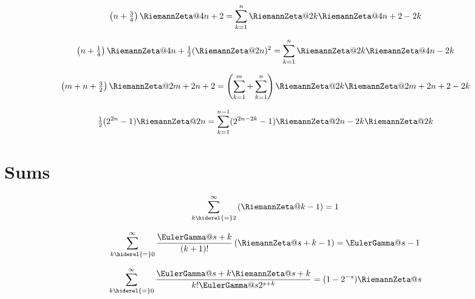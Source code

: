 \documentclass{article}
\begin{document}
\begin{equation}\label{eq:ZE.INA.REC3}%
  \left( n + \tfrac{3}{4} \right) \RiemannZeta@{4n+2}
  = \sum_{k=1}^n \RiemannZeta@{2k} \RiemannZeta@{4n+2-2k}
\end{equation}

\begin{equation}\label{eq:ZE.INA.REC4}%
  {\left( n + \tfrac{1}{4} \right) \RiemannZeta@{4n}
  + \tfrac{1}{2} (\RiemannZeta@{2n})^2
  = \sum_{k=1}^n \RiemannZeta@{2k} \RiemannZeta@{4n-2k}}
\end{equation}

\begin{equation}\label{eq:ZE.INA.REC5}%
  \left( m + n + \tfrac{3}{2} \right) \RiemannZeta@{2m+2n+2}
  = \left( \sum_{k=1}^m + \sum_{k=1}^n \right)
               \RiemannZeta@{2k} \RiemannZeta@{2m+2n+2-2k}
\end{equation}

\begin{equation}\label{eq:ZE.INA.REC6}%
  \tfrac{1}{2} (2^{2n} - 1) \RiemannZeta@{2n}
  = \sum_{k=1}^{n-1} (2^{2n-2k} - 1) \RiemannZeta@{2n-2k} \RiemannZeta@{2k}
\end{equation}

\section{Sums}\label{sec:ZE.Sums}


\begin{equation}\label{eq:ZE.SUM.SUM1}
  \sum_{k \hiderel{=} 2}^\infty \left( \RiemannZeta@{k} - 1 \right) = 1 
\end{equation}

\begin{equation}\label{eq:ZE.SUM.SUM2}
  \sum_{k \hiderel{=} 0}^\infty
      \frac{\EulerGamma@{s+k}}{(k+1)!} \left( \RiemannZeta@{s+k} - 1 \right)
  = \EulerGamma@{s-1}
\end{equation}

\begin{equation}\label{eq:ZE.SUM.SUM3}%
  \sum_{k \hiderel{=} 0}^\infty
      \frac{\EulerGamma@{s+k} \RiemannZeta@{s+k}}{k! \EulerGamma@{s} 2^{s+k}}
  = (1 - 2^{-s}) \RiemannZeta@{s}
\end{equation}
\end{document}
